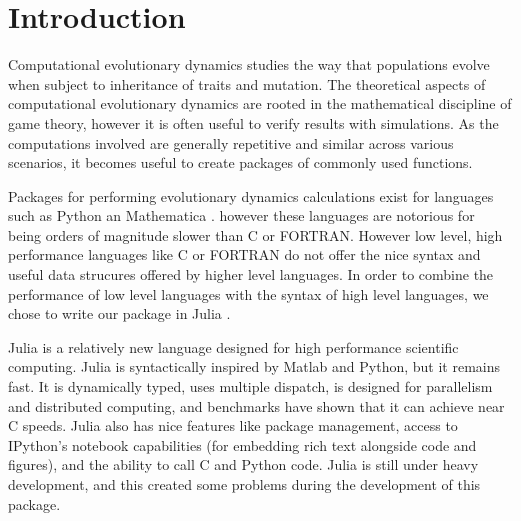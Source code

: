 \section{Introduction}

Computational evolutionary dynamics studies the way that populations evolve when subject to inheritance of traits and mutation.
The theoretical aspects of computational evolutionary dynamics are rooted in the mathematical discipline of game theory, however it is often useful to verify results with simulations.
As the computations involved are generally repetitive and similar across various scenarios, it becomes useful to create packages of commonly used functions.

Packages for performing evolutionary dynamics calculations exist for languages such as Python \cite{pyevodyn} an Mathematica \cite{dynamo}. however these languages are notorious for being orders of magnitude slower than C or FORTRAN.
However low level, high performance languages like C or FORTRAN do not offer the nice syntax and useful data strucures offered by higher level languages.
In order to combine the performance of low level languages with the syntax of high level languages, we chose to write our package in Julia \cite{julia}.

Julia is a relatively new language designed for high performance scientific computing.
Julia is syntactically inspired by Matlab and Python, but it remains fast.
It is dynamically typed, uses multiple dispatch, is designed for parallelism and distributed computing, and benchmarks have shown that it can achieve near C speeds.
Julia also has nice features like package management, access to IPython's notebook capabilities (for embedding rich text alongside code and figures), and the ability to call C and Python code.
Julia is still under heavy development, and this created some problems during the development of this package.
